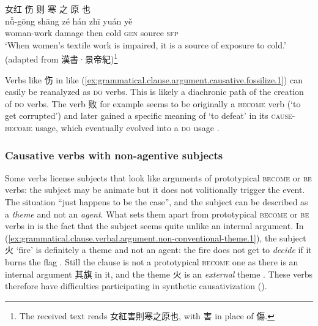 \documentclass[UTF8, a4paper, oneside, scheme=plain, 12pt]{ctexrep}
\newcommand*{\citepage}[1]{p.~{#1}}
\newcommand*{\term}[1]{\emph{#1}}
\newcommand{\translate}[1]{`#1'}
\newcommand*{\category}[1]{\textsc{#1}}
\begin{document}
\begin{exe}
    \ex\label{ex:grammatical.clause.argument.causative.fossilize.1}
    \glll 女红 伤 则 寒 之 原 也 \\
    nǚ-gōng shāng zé hán zhī yuán yě \\
    woman-work damage then cold \category{gen} source \category{sfp} \\
    \glt\translate{When women's textile work is impaired, it is a source of exposure to cold.} \hfill (adapted from 漢書·景帝紀)\footnote{The received text reads 女紅害則寒之原也, with 害 in place of 傷.}
\end{exe}

Verbs like 伤 in like (\ref{ex:grammatical.clause.argument.causative.fossilize.1}) can easily be reanalyzed as \category{do} verbs.
This is likely a diachronic path of the creation of \category{do} verbs.
The verb 败 for example seems to be originally a \category{become} verb (\translate{to get corrupted})
and later gained a specific meaning of \translate{to defeat} in its \category{cause}-\category{become} usage,
which eventually evolved into a \category{do} usage
\citep[\citepage{285}]{meiguang2018}.

\subsubsection{Causative verbs with non-agentive subjects}
\label{sec:grammatical.clause.verbal.argument.simple.non-conventional-state}

Some verbs license subjects that look like arguments of prototypical \category{become} or \category{be} verbs:
the subject may be animate but it does not volitionally trigger the event.
The situation ``just happens to be the case'', and the subject can be described as a \term{theme} and not an \term{agent}.
What sets them apart from prototypical \category{become} or \category{be} verbs 
in 
is the fact that the subject seems quite unlike an internal argument.
In (\ref{ex:grammatical.clause.verbal.argument.non-conventional-theme.1}),
the subject 火 \translate{fire} is definitely a theme and not an agent:
the fire does not get to \emph{decide} if it burns the flag
\citep[\citepage{276}]{meiguang2018}.
Still the clause is not a prototypical \category{become} one
as there is an internal argument 其旗 in it,
and the theme 火 is an \emph{external} theme
\citep[\citepage{353}]{meiguang2018}.
These verbs therefore have difficulties participating in synthetic causativization
().
\end{document}

